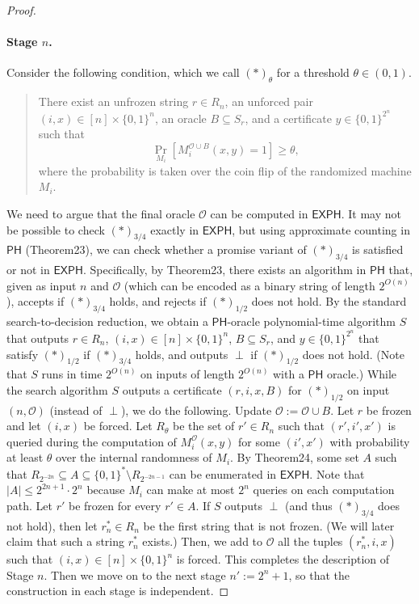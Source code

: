 \documentclass[10pt,a4paper]{article}
\begin{document}
\begin{proof}
\paragraph{Stage $n$.} Consider the following condition, which we call $(*)_{\theta}$ for a threshold $\theta\in(0,1)$.
\begin{quote}
There exist an unfrozen string $r\in R_n$, an unforced pair $(i,x)\in[n]\times\{0,1\}^n$, an oracle $B\subseteq S_r$, and a certificate $y\in\{0,1\}^{2^n}$ such that
\[\Pr_{M_i}[M_i^{\mathcal O\cup B}(x,y)=1]\geq\theta,\]
where the probability is taken over the coin flip of the randomized machine $M_i$.
\end{quote}
We need to argue that the final oracle $\mathcal O$ can be computed in $\mathsf{EXPH}$. It may not be possible to check $(*)_{3/4}$ exactly in $\mathsf{EXPH}$, but using approximate counting in $\mathsf{PH}$ (Theorem23), we can check whether a promise variant of $(*)_{3/4}$ is satisfied or not in $\mathsf{EXPH}$. Specifically, by Theorem23, there exists an algorithm in $\mathsf{PH}$ that, given as input $n$ and $\mathcal O$ (which can be encoded as a binary string of length $2^{O(n)}$), accepts if $(*)_{3/4}$ holds, and rejects if $(*)_{1/2}$ does not hold. By the standard search-to-decision reduction, we obtain a $\mathsf{PH}$-oracle polynomial-time algorithm $S$ that outputs $r\in R_n$, $(i,x)\in[n]\times\{0,1\}^n$, $B\subseteq S_r$, and $y\in\{0,1\}^{2^n}$ that satisfy $(*)_{1/2}$ if $(*)_{3/4}$ holds, and outputs $\perp$ if $(*)_{1/2}$ does not hold. (Note that $S$ runs in time $2^{O(n)}$ on inputs of length $2^{O(n)}$ with a $\mathsf{PH}$ oracle.)
While the search algorithm $S$ outputs a certificate $(r,i,x,B)$ for $(*)_{1/2}$ on input $(n,\mathcal O)$ (instead of $\perp$), we do the following. Update $\mathcal O:=\mathcal O\cup B$. Let $r$ be frozen and let $(i,x)$ be forced. Let $R_{\theta}$ be the set of $r'\in R_n$ such that $(r',i',x')$ is queried during the computation of $M_i^{\mathcal O}(x,y)$ for some $(i',x')$ with probability at least $\theta$ over the internal randomness of $M_i$. By Theorem24, some set $A$ such that $R_{2^{-2n}}\subseteq A\subseteq\{0,1\}^*\setminus R_{2^{-2n-1}}$ can be enumerated in $\mathsf{EXPH}$. Note that $|A|\leq2^{2n+1}\cdot2^n$ because $M_i$ can make at most $2^n$ queries on each computation path. Let $r'$ be frozen for every $r'\in A$. If $S$ outputs $\perp$ (and thus $(*)_{3/4}$ does not hold), then let $r_n^*\in R_n$ be the first string that is not frozen. (We will later claim that such a string $r_n^*$ exists.) Then, we add to $\mathcal O$ all the tuples $(r_n^*,i,x)$ such that $(i,x)\in[n]\times\{0,1\}^n$ is forced. This completes the description of Stage $n$. Then we move on to the next stage $n':=2^n+1$, so that the construction in each stage is independent.

\end{proof}
\end{document}
